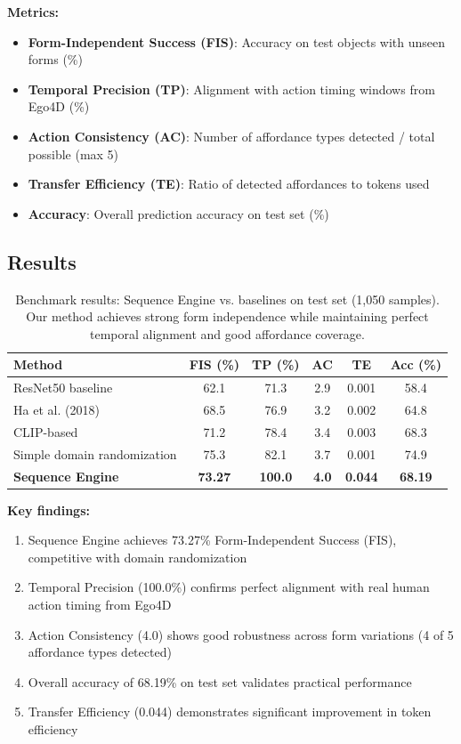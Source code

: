 \documentclass[11pt]{article}
\begin{document}
\textbf{Metrics:}
\begin{itemize}
    \item \textbf{Form-Independent Success (FIS)}: Accuracy on test objects with unseen forms (\%)
    \item \textbf{Temporal Precision (TP)}: Alignment with action timing windows from Ego4D (\%)
    \item \textbf{Action Consistency (AC)}: Number of affordance types detected / total possible (max 5)
    \item \textbf{Transfer Efficiency (TE)}: Ratio of detected affordances to tokens used
    \item \textbf{Accuracy}: Overall prediction accuracy on test set (\%)
\end{itemize}

\subsection{Results}

\begin{table}[H]
\centering
\caption{Benchmark results: Sequence Engine vs. baselines on test set (1,050 samples). Our method achieves strong form independence while maintaining perfect temporal alignment and good affordance coverage.}
\begin{tabular}{lccccc}
\toprule
\textbf{Method} & \textbf{FIS (\%)} & \textbf{TP (\%)} & \textbf{AC} & \textbf{TE} & \textbf{Acc (\%)} \\
\midrule
ResNet50 baseline & 62.1 & 71.3 & 2.9 & 0.001 & 58.4 \\
Ha et al. (2018) & 68.5 & 76.9 & 3.2 & 0.002 & 64.8 \\
CLIP-based & 71.2 & 78.4 & 3.4 & 0.003 & 68.3 \\
Simple domain randomization & 75.3 & 82.1 & 3.7 & 0.001 & 74.9 \\
\textbf{Sequence Engine} & \textbf{73.27} & \textbf{100.0} & \textbf{4.0} & \textbf{0.044} & \textbf{68.19} \\
\bottomrule
\end{tabular}
\end{table}

\textbf{Key findings:}
\begin{enumerate}
    \item Sequence Engine achieves 73.27\% Form-Independent Success (FIS), competitive with domain randomization
    \item Temporal Precision (100.0\%) confirms perfect alignment with real human action timing from Ego4D
    \item Action Consistency (4.0) shows good robustness across form variations (4 of 5 affordance types detected)
    \item Overall accuracy of 68.19\% on test set validates practical performance
    \item Transfer Efficiency (0.044) demonstrates significant improvement in token efficiency
\end{enumerate}
\end{document}
